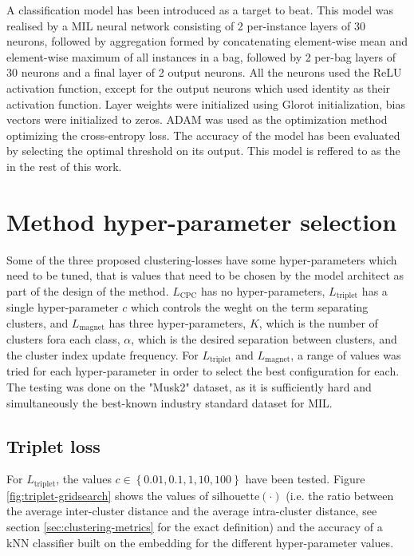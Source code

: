 A classification model has been introduced as a target to beat. This model was realised by a MIL neural network consisting of 2 per-instance layers of 30 neurons, followed by aggregation formed by concatenating element-wise mean and element-wise maximum of all instances in a bag, followed by 2 per-bag layers of 30 neurons and a final layer of 2 output neurons. All the neurons used the ReLU activation function, except for the output neurons which used identity as their activation function. Layer weights were initialized using Glorot initialization, bias vectors were initialized to zeros. ADAM was used as the optimization method optimizing the cross-entropy loss. The accuracy of the model has been evaluated by selecting the optimal threshold on its output. This model is reffered to as the  in the rest of this work.

\section{Method hyper-parameter selection}

Some of the three proposed clustering-losses have some hyper-parameters which need to be tuned, that is values that need to be chosen by the model architect as part of the design of the method. \( L_\mathrm{CPC} \) has no hyper-parameters, \( L_\mathrm{triplet} \) has a single hyper-parameter \( c \) which controls the weght on the term separating clusters, and \( L_\mathrm{magnet} \) has three hyper-parameters, \( K \), which is the number of clusters fora each class, \( \alpha \), which is the desired separation between clusters, and the cluster index update frequency. For \( L_\mathrm{triplet} \) and \( L_\mathrm{magnet} \), a range of values was tried for each hyper-parameter in order to select the best configuration for each. The testing was done on the "Musk2" dataset, as it is sufficiently hard and simultaneously the best-known industry standard dataset for MIL.

\subsection{Triplet loss}
For \( L_\mathrm{triplet} \), the values \( c \in \left\{ 0.01, 0.1, 1, 10, 100 \right\} \) have been tested. Figure \ref{fig:triplet-gridsearch} shows the values of \( \mathrm{silhouette} \left( \cdot \right) \) (i.e. the ratio between the average inter-cluster distance and the average intra-cluster distance, see section \ref{sec:clustering-metrics} for the exact definition) and the accuracy of a kNN classifier built on the embedding for the different hyper-parameter values.

